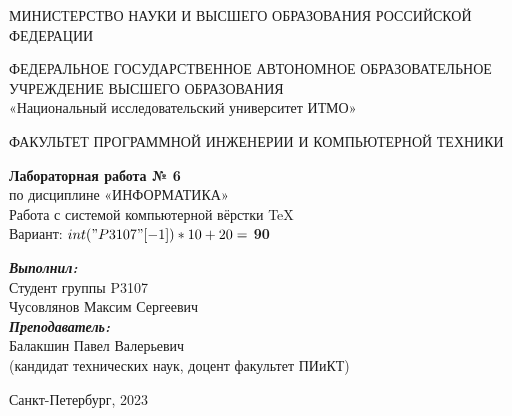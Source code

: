 \thispagestyle{empty}
\begin{center}
    МИНИСТЕРСТВО НАУКИ И ВЫСШЕГО ОБРАЗОВАНИЯ РОССИЙСКОЙ ФЕДЕРАЦИИ

    \vspace{1em}
    ФЕДЕРАЛЬНОЕ ГОСУДАРСТВЕННОЕ АВТОНОМНОЕ ОБРАЗОВАТЕЛЬНОЕ УЧРЕЖДЕНИЕ ВЫСШЕГО ОБРАЗОВАНИЯ\\
    «Национальный исследовательский университет ИТМО»

    \vspace{4em}
    ФАКУЛЬТЕТ ПРОГРАММНОЙ ИНЖЕНЕРИИ И КОМПЬЮТЕРНОЙ ТЕХНИКИ

    \vspace{16em}
    
    {\Large \textbf{Лабораторная работа № 6}}\\[1em]
    {\Large по дисциплине «ИНФОРМАТИКА»}\\[1em]
    {Работа с системой компьютерной вёрстки \TeX}\\[1em]
    Вариант: $int("P3107"[-1]) * 10 + 20 =$ \textbf{90}
\end{center}

\vspace{10em}

\begin{flushright}
    \textbf{\textit{Выполнил:}} \\
    Студент группы P3107 \\
    Чусовлянов Максим Сергеевич\\
    \textbf{\textit{Преподаватель:}} \\
    Балакшин Павел Валерьевич \\
    (кандидат технических наук, доцент факультет ПИиКТ)
\end{flushright}
\vspace{6em}

\begin{center}
Санкт-Петербург, 2023
\end{center}
